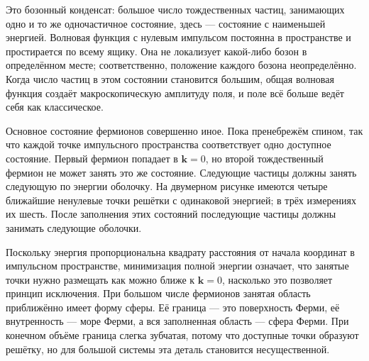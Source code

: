 Это бозонный конденсат: большое число тождественных частиц, занимающих одно и то же одночастичное состояние, здесь — состояние с наименьшей энергией. Волновая функция с нулевым импульсом постоянна в пространстве и простирается по всему ящику. Она не локализует какой-либо бозон в определённом месте; соответственно, положение каждого бозона неопределённо. Когда число частиц в этом состоянии становится большим, общая волновая функция создаёт макроскопическую амплитуду поля, и поле всё больше ведёт себя как классическое.

Основное состояние фермионов совершенно иное. Пока пренебрежём спином, так что каждой точке импульсного пространства соответствует одно доступное состояние. Первый фермион попадает в \(\mathbf{k}=0\), но второй тождественный фермион не может занять это же состояние. Следующие частицы должны занять следующую по энергии оболочку. На двумерном рисунке имеются четыре ближайшие ненулевые точки решётки с одинаковой энергией; в трёх измерениях их шесть. После заполнения этих состояний последующие частицы должны занимать следующие оболочки.

Поскольку энергия пропорциональна квадрату расстояния от начала координат в импульсном пространстве, минимизация полной энергии означает, что занятые точки нужно размещать как можно ближе к \(\mathbf{k}=0\), насколько это позволяет принцип исключения. При большом числе фермионов занятая область приближённо имеет форму сферы. Её граница — это поверхность Ферми, её внутренность — море Ферми, а вся заполненная область — сфера Ферми. При конечном объёме граница слегка зубчатая, потому что доступные точки образуют решётку, но для большой системы эта деталь становится несущественной.

